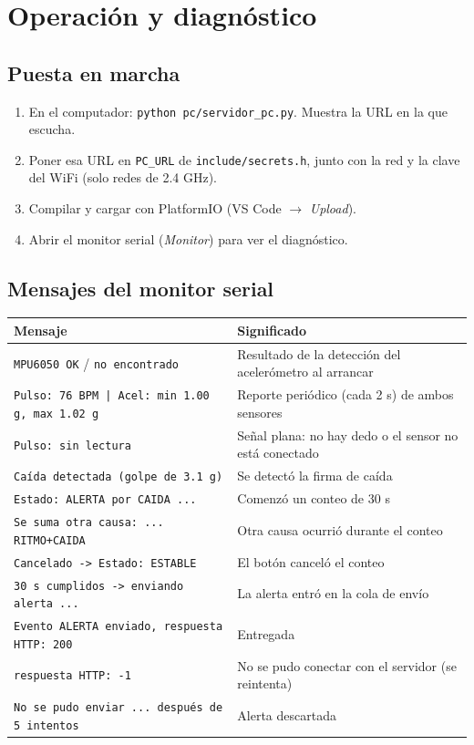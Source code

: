 \documentclass[11pt,a4paper]{article}
\begin{document}
\section{Operación y diagnóstico}

\subsection{Puesta en marcha}

\begin{enumerate}[leftmargin=*]
  \item En el computador: \texttt{python pc/servidor\_pc.py}. Muestra la URL en la que escucha.
  \item Poner esa URL en \texttt{PC\_URL} de \texttt{include/secrets.h}, junto con la red y la clave del WiFi (solo redes de 2.4 GHz).
  \item Compilar y cargar con PlatformIO (VS Code $\rightarrow$ \emph{Upload}).
  \item Abrir el monitor serial (\emph{Monitor}) para ver el diagnóstico.
\end{enumerate}

\subsection{Mensajes del monitor serial}

\begin{center}
\begin{tabular}{@{}>{\raggedright\arraybackslash}p{7.3cm} >{\raggedright\arraybackslash}p{7.6cm}@{}}
\toprule
\textbf{Mensaje} & \textbf{Significado}\\
\midrule
\texttt{MPU6050 OK} / \texttt{no encontrado} & Resultado de la detección del acelerómetro al arrancar\\
\texttt{Pulso: 76 BPM | Acel: min 1.00 g, max 1.02 g} & Reporte periódico (cada 2 s) de ambos sensores\\
\texttt{Pulso: sin lectura} & Señal plana: no hay dedo o el sensor no está conectado\\
\texttt{Caída detectada (golpe de 3.1 g)} & Se detectó la firma de caída\\
\texttt{Estado: ALERTA por CAIDA ...} & Comenzó un conteo de 30 s\\
\texttt{Se suma otra causa: ... RITMO+CAIDA} & Otra causa ocurrió durante el conteo\\
\texttt{Cancelado -> Estado: ESTABLE} & El botón canceló el conteo\\
\texttt{30 s cumplidos -> enviando alerta ...} & La alerta entró en la cola de envío\\
\texttt{Evento ALERTA enviado, respuesta HTTP: 200} & Entregada\\
\texttt{respuesta HTTP: -1} & No se pudo conectar con el servidor (se reintenta)\\
\texttt{No se pudo enviar ... después de 5 intentos} & Alerta descartada\\
\bottomrule
\end{tabular}
\end{center}
\end{document}
